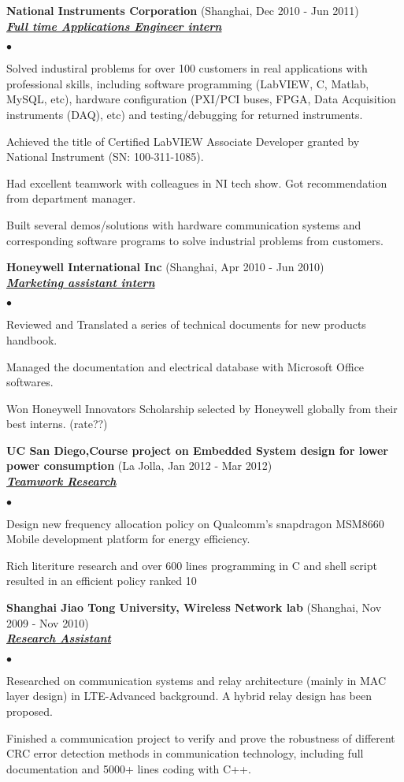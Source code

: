 \documentclass{article}
\newcommand{\employer}[3]{{ \textbf{#1} (#2)\\ \underline{\textbf{\emph{#3}}}\\  }}
\newenvironment{achievements}{\begin{list}{$\bullet$}{\topsep 0pt \itemsep -2pt}}{\vspace*{4pt}\end{list}}
\begin{document}
\employer{National Instruments Corporation}{Shanghai, Dec 2010 - Jun 2011}{Full time Applications Engineer intern}
	\begin{achievements}
	\item Solved industiral problems for over 100 customers in real applications with professional skills, including software programming (LabVIEW, C, Matlab, MySQL, etc), hardware configuration (PXI/PCI buses, FPGA, Data Acquisition instruments (DAQ), etc) and testing/debugging for returned instruments.
	\item Achieved the title of Certified LabVIEW Associate Developer granted by National Instrument (SN: 100-311-1085).
	\item Had excellent teamwork with colleagues in NI tech show. Got recommendation from department manager.
	\item Built several demos/solutions with hardware communication systems and corresponding software programs to solve industrial problems from customers.
	\end{achievements}

\employer{Honeywell International Inc}{Shanghai, Apr 2010 - Jun 2010} {Marketing assistant intern}
	\begin{achievements}
	\item Reviewed and Translated a series of technical documents for new products handbook.
	\item Managed the documentation and electrical database with Microsoft Office softwares.
	\item Won Honeywell Innovators Scholarship selected by Honeywell globally from their best interns. (rate??)
	\end{achievements}

\employer{UC San Diego,Course project on Embedded System design for lower power consumption}{La Jolla, Jan 2012 - Mar 2012}{Teamwork Research}
	\begin{achievements}
	\item Design new frequency allocation policy on Qualcomm’s snapdragon MSM8660 Mobile development platform for energy efficiency. 
	\item Rich literiture research and over 600 lines programming in C and shell script resulted in an efficient policy ranked 10%
	\end{achievements}

\employer{Shanghai Jiao Tong University, Wireless Network lab}{Shanghai, Nov 2009 - Nov 2010}
	{Research Assistant}
	\begin{achievements}
	\item Researched on communication systems and relay architecture (mainly in MAC layer design) in LTE-Advanced
	      background. A hybrid relay design has been proposed.
	\item Finished a communication project to verify and prove the robustness of different CRC error
	      detection methods in communication technology, including full documentation and 5000+ lines coding
	      with C++.
	\end{achievements}
\end{document}
